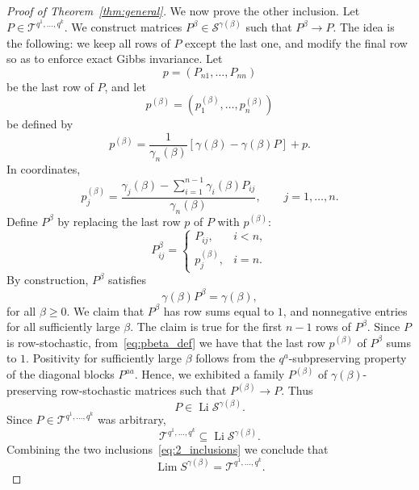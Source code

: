 \documentclass[10pt,a4paper]{amsart}
\begin{document}
\begin{proof}[Proof of Theorem~\ref{thm:general}]
				We now prove the other inclusion.
				Let $P\in\mathcal T^{q^1,\ldots,q^k}$. 
				We construct matrices
				$P^{\beta}\in \mathcal{S}^{\gamma(\beta)}$
				such that
				$P^{\beta}\to P$.
				The idea is the following: we keep all rows of $P$ except the last one, and modify the final row so as to enforce exact Gibbs invariance.
				Let
				$$
				p=(P_{n1},\ldots,P_{nn})
				$$
				be the last row of $P$, and let
				$$
				p^{(\beta)}=(p^{(\beta)}_1,\ldots,p^{(\beta)}_n)
				$$
				be defined by
				\begin{equation}
					\label{eq:pbeta_def}
					p^{(\beta)}=\frac{1}{\gamma_n(\beta)}\left[\gamma(\beta)-\gamma(\beta)P\right]+p.
				\end{equation}
				In coordinates,
				\begin{equation}
					\label{eq:pbeta}
					p^{(\beta)}_j
					=
					\frac{
						\gamma_j(\beta)
						-
						\sum_{i=1}^{n-1}
						\gamma_i(\beta)P_{ij}
					}
					{\gamma_n(\beta)},
					\qquad
					j=1,\ldots,n.
				\end{equation}
				Define $P^{\beta}$ by replacing the last row $p$ of $P$ with $p^{(\beta)}$:
				\begin{equation}
					P^{\beta}_{ij}
					=
					\begin{cases}
						P_{ij}, & i<n,\\
						p^{(\beta)}_j, & i=n.
					\end{cases}
				\end{equation}
				By construction, $P^{\beta}$ satisfies
				$$
				\gamma(\beta)P^{\beta}
				=
				\gamma(\beta),
				$$
				for all $\beta\geq0$. 
				We claim that $P^{\beta}$ has row sums equal to $1$, and nonnegative entries for all sufficiently large $\beta$. The claim is true for the first $n-1$ rows of $P^{\beta}$. Since $P$ is row-stochastic, from~\eqref{eq:pbeta_def} we have that the last row $p^{(\beta)}$ of $P^{\beta}$ sums to $1$. 
				Positivity for sufficiently large $\beta$ follows from the $q^a$-subpreserving property of the diagonal blocks $P^{aa}$.
				Hence, we exhibited a family $P^{(\beta)}$ of  $\gamma(\beta)$-preserving row-stochastic matrices such that  $P^{(\beta)}\to P$.
				Thus
				$$
				P\in
				\operatorname*{Li}\mathcal{S}^{\gamma(\beta)}.
				$$
				Since $P\in\mathcal T^{q^1,\ldots,q^k}$ was arbitrary,
				$$
				\mathcal T^{q^1,\ldots,q^k}
				\subseteq
				\operatorname*{Li}\mathcal{S}^{\gamma(\beta)}. 
				$$
				Combining the two inclusions~\eqref{eq:2_inclusions}
				we conclude that
				\begin{equation}
					\operatorname{Lim}S^{\gamma(\beta)}= \mathcal T^{q^1,\ldots,q^k}.
				\end{equation}
				
				
			\end{proof}
\end{document}
